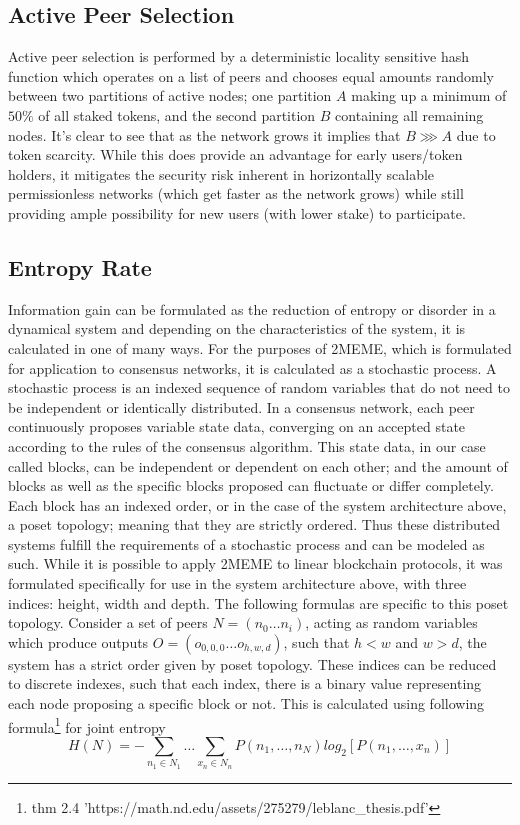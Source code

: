 \documentclass{article}
\theoremstyle{definition}
\theoremstyle{remark}
\theoremstyle{plain}
\begin{document}
\subsection{Active Peer Selection}
Active peer selection is performed by a deterministic locality sensitive hash function which operates on a list of peers and chooses equal amounts randomly between two partitions of active nodes; one partition $A$ making up a minimum of $50\%$ of all staked tokens, and the second partition $B$ containing all remaining nodes. It's clear to see that as the network grows it implies that $B \ggg A$ due to token scarcity. While this does provide an advantage for early users/token holders, it mitigates the security risk inherent in horizontally scalable permissionless networks (which get faster as the network grows) while still providing ample possibility for new users (with lower stake) to participate. 


\subsection{Entropy Rate}
Information gain can be formulated as the reduction of entropy or disorder in a dynamical system and depending on the characteristics of the system, it is calculated in one of many ways. For the purposes of 2MEME, which is formulated for application to consensus networks, it is calculated as a stochastic process.
	A stochastic process is an indexed sequence of random variables that do not need to be independent or identically distributed. In a consensus network, each peer continuously proposes variable state data, converging on an accepted state according to the rules of the consensus algorithm. This state data, in our case called blocks, can be independent or dependent on each other; and the amount of blocks as well as the specific blocks proposed can fluctuate or differ completely. Each block has an indexed order, or in the case of the system architecture above, a poset topology; meaning that they are strictly ordered. Thus these distributed systems fulfill the requirements of a stochastic process and can be modeled as such. While it is possible to apply 2MEME to linear blockchain protocols, it was formulated specifically for use in the system architecture above, with three indices: height, width and depth. The following formulas are specific to this poset topology.
	Consider a set of peers $N = (n_0 …n_i)$, acting as random variables which produce outputs $O = (o_{0,0,0} … o_{h,w,d})$, such that $h<w$ and $w>d$, the system has a strict order given by poset topology. These indices can be reduced to discrete indexes, such that each index, there is a binary value representing each node proposing a specific block or not. This is calculated using following formula\footnote{thm 2.4 'https://math.nd.edu/assets/275279/leblanc\_thesis.pdf'} for joint entropy	
\begin{equation}
H(N) = -\sum_{n_1 \in N_1} \dots \sum_{x_n \in N_n} P(n_1,  \dots, n_N) log_2 [P(n_1, \dots, x_n)]
\end{equation}
	
\end{document}
